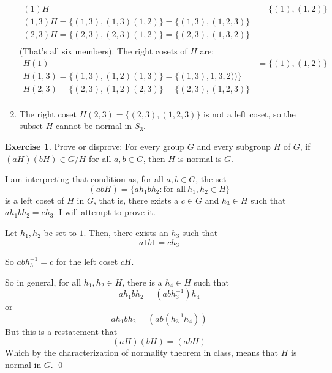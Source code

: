\documentclass[11pt,oneside]{article}
\numberwithin{equation}{section}
\theoremstyle{definition}
\newtheorem{exercise}{Exercise}
\begin{document}
\begin{solution}
\begin{enumerate}
      \begin{align*}
        (1)H & = \{ (1), (1, 2) \} & \\
        (1, 3)H = \{ (1,3), (1,3)(1,2) \} = \{ (1,3), (1, 2, 3) \} & \\
        (2, 3)H = \{ (2,3), (2, 3)(1, 2) \} = \{ (2, 3), (1, 3, 2) \} & \\
      \end{align*}
      (That's all six members).  The right cosets of $H$ are:
      \begin{align*}
        H(1) & = \{ (1), (1, 2) \} & \\
        H(1, 3) = \{ (1,3), (1,2)(1,3) \} = \{ (1,3), 1, 3, 2)) \} & \\
        H(2, 3) = \{ (2,3), (1, 2)(2, 3) \} = \{ (2, 3), (1, 2, 3) \} & \\
      \end{align*}
    \item
      The right coset $H (2, 3) = \{ (2, 3), (1, 2, 3) \} $ is not a left coset, so
      the subset $H$ cannot be normal in $S_3$.

  \end{enumerate}
\end{solution}

\begin{exercise}
  Prove or disprove: For every group $G$ and every subgroup $H$ of
  $G$, if $(aH)(bH) \in G / H$ for all $a, b \in G$, then $H$ is
  normal is $G$.
\end{exercise}
\begin{solution}
  I am interpreting that condition as, for all $a, b \in G$, the set
  $$ 
  (abH) = \{ a h_1 b h_2: \text{for all} \ h_1, h_2 \in H \}
  $$
  is a left coset of $H$ in $G$, that is, there exists a
  $c \in G$ and $h_3 \in H$ such that $a h_1 b h_2 = c h_3$.
  I will attempt to prove it.

  Let $h_1, h_2$ be set to $1$. Then, there exists an $h_3$ such that
  $$
  a 1 b 1 = c h_3
  $$

  So $ a b h_3 ^{-1} = c$ for the left coset $cH$.

  So in general, for all $h_1, h_2 \in H$, there is a $h_4 \in H$ such that
  $$
  a h_1 b h_2 = (a b h_3 ^  { -1} ) h_4
  $$
  or
  $$
  a h_1 b h_2 = ( a b ( h_3 ^ {-1} h_4))
  $$
  But this is a restatement that
  $$
  (aH)(bH) = (abH)
  $$
  Which by the characterization of normality theorem in class, means that $H$ is normal in $G$.  
  \qed
\end{solution}

\begin{comment}
  \begin{exercise}
    problem
  \end{exercise}
  \begin{solution}
    \begin{enumerate}[(a)]
    \item
      first answer
    \end{enumerate}
  \end{solution}
\end{comment}
\end{document}
